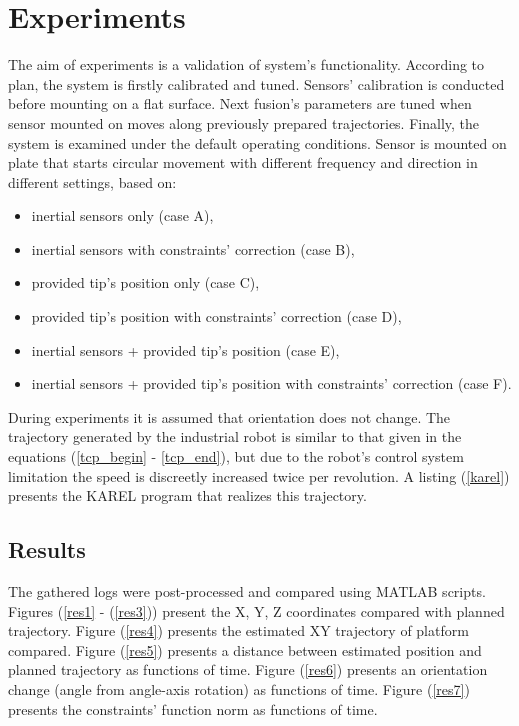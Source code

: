 \chapter{Experiments}

The aim of experiments is a validation of system's functionality. According to plan, the system is firstly calibrated and tuned. Sensors' calibration is conducted before mounting on a flat surface. Next fusion's parameters are tuned when sensor mounted on  moves along previously prepared trajectories. Finally, the system is examined under the default operating conditions. Sensor is mounted on plate that starts circular movement with different frequency and direction in different settings, based on:
\begin{itemize}
	\item inertial sensors only (case A),
	\item inertial sensors with constraints' correction (case B),
	\item provided tip's position only (case C),
	\item provided tip's position with constraints' correction (case D),
	\item inertial sensors + provided tip's position (case E),
	\item inertial sensors + provided tip's position with constraints' correction (case F).
\end{itemize}

During experiments it is assumed that orientation does not change. The trajectory generated by the industrial robot is similar to that given in the equations (\ref{tcp_begin} - \ref{tcp_end}), but due to the robot's control system limitation the speed is discreetly increased twice per revolution. A listing (\ref{karel}) presents the KAREL program that realizes this trajectory.


\section{Results}

The gathered logs were post-processed and compared using MATLAB scripts. Figures (\ref{res1} - (\ref{res3})) present the X, Y, Z coordinates compared with planned trajectory. Figure (\ref{res4}) presents the estimated XY trajectory of platform compared.
Figure (\ref{res5}) presents a distance between estimated position and planned trajectory as functions of time. Figure (\ref{res6}) presents an orientation change (angle from angle-axis rotation) as functions of time. Figure (\ref{res7}) presents the constraints' function norm as functions of time.

